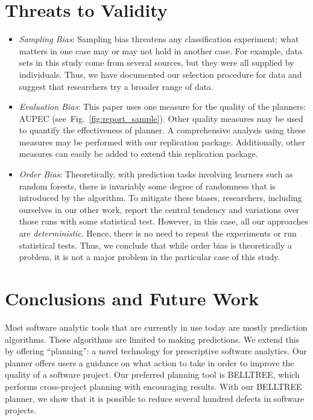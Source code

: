 \documentclass[smallextended]{svjour3}       %
\newcommand{\fig}[1]{Fig.~\ref{fig:#1}}
\begin{document}
\section{Threats to Validity}
\label{sect:threats}
\begin{itemize}[leftmargin=-1pt]
\item[] \textit{Sampling Bias}: Sampling bias threatens any classification experiment;
what matters in one case may or may not hold in another case. 
For example, data sets in this study come from several sources, but they were all supplied by individuals. Thus, we have documented our selection procedure for data and suggest that researchers
try a broader range of data.
\item[] \textit{Evaluation Bias}:
This paper uses one measure for the quality of the planners: AUPEC (see~\fig{report_sample}). Other quality measures may be used to quantify the effectiveness of planner. A comprehensive analysis using these measures may be performed with our replication package. Additionally, other measures can easily be added to extend this replication package.

\item[] \textit{Order Bias}: 
Theoretically, with prediction tasks involving learners such as random forests, there is invariably some degree of randomness that is introduced by the algorithm. To mitigate these biases, researchers, including ourselves in our other work, report the central tendency and variations over those runs with some statistical test. However, in this case, all our approaches are \textit{deterministic}. Hence, there is no need to repeat the experiments or run statistical tests. Thus, we conclude that while order bias is theoretically a problem, 
it is not a major problem in the particular case of this study.
\end{itemize}

\section{Conclusions and Future Work}
\label{sect:future}

Most software analytic tools that are currently in use today are mostly prediction algorithms. These algorithms are limited to making predictions. We extend this by offering ``planning'': a novel technology for prescriptive software analytics. Our planner offers users a guidance on what action to take in order to improve the quality of a software project. Our preferred planning tool is BELLTREE, which performs cross-project planning with encouraging results. With our BELLTREE planner, we show that it is possible to reduce several hundred defects in software projects. 
\end{document}
